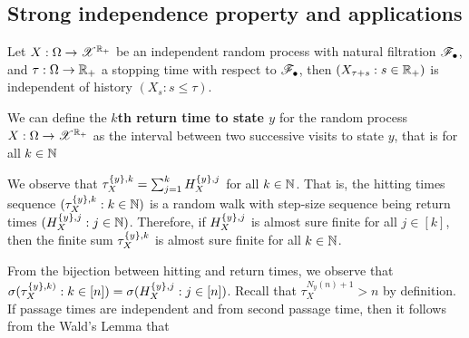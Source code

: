 \documentclass[a4paper,10pt,english]{article}
\begin{document}
\subsection{Strong independence property and applications}
\begin{thm} Let $X: \Omega\to\mathscr{X}^{\mathbb{R}_+}$ be an independent random process with natural filtration $\mathscr{F}_\bullet$, and $\tau:\Omega\to\mathbb{R}_+$ a stopping time with respect to $\mathscr{F}_\bullet$, 
then $(X_{\tau+s}: s \in \mathbb{R}_+)$ is independent of history $(X_s: s \le \tau)$. 
\end{thm}
\begin{defn} 
We can define the \textbf{$k$th return time to state $y$} for the random process $X:\Omega\to\mathscr{X}^{\mathbb{R}_+}$ as the interval between two successive visits to state $y$, that is for all $k \in \mathbb{N}$
\end{defn}
\begin{rem}
We observe that $\tau_X^{\left\{y\right\}, k} = \sum_{j=1}^kH_X^{\left\{y\right\}, j}$ for all $k \in \mathbb{N}$. 
That is, the hitting times sequence $(\tau_X^{\left\{y\right\},k}: k \in \mathbb{N})$ is a random walk with step-size sequence being return times $(H_X^{\left\{y\right\},j}: j \in \mathbb{N})$. 
Therefore, if $H_X^{\left\{y\right\}, j}$ is almost sure finite for all $j \in [k]$, 
then the finite sum $\tau_X^{\left\{y\right\}, k}$ is almost sure finite for all $k\in \mathbb{N}$.  
\end{rem}
\begin{rem} 
From the bijection between hitting and return times, 
we observe that $\sigma(\tau_X^{\left\{y\right\}, k)}: k \in [n]) =  \sigma(H_X^{\left\{y\right\}, j}: j \in [n])$. 
Recall that $\tau_X^{N_y(n)+1} > n$ by definition. 
If passage times are independent and \iid from second passage time, 
then it follows from the Wald's Lemma that 
\end{rem}
\end{document}
